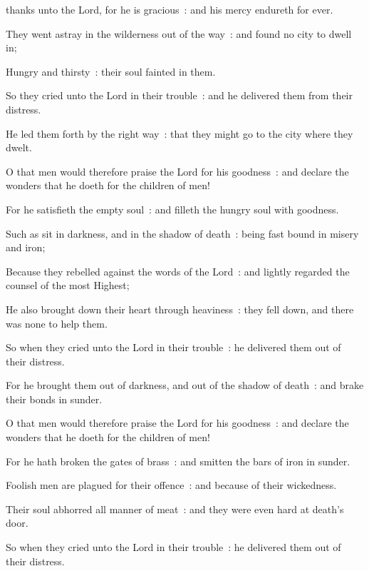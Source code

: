  thanks unto the Lord, for he is gracious~: and his mercy endureth for ever.\par
{}
They went astray in the wilderness out of the way~: and found no city to dwell in;\par
{}Hungry and thirsty~: their soul fainted in them.\par
{}So they cried unto the Lord in their trouble~: and he delivered them from their distress.\par
{}He led them forth by the right way~: that they might go to the city where they dwelt.\par
{}O that men would therefore praise the Lord for his goodness~: and declare the wonders that he doeth for the children of men!\par
{}For he satisfieth the empty soul~: and filleth the hungry soul with goodness.\par
{}Such as sit in darkness, and in the shadow of death~: being fast bound in misery and iron;\par
{}Because they rebelled against the words of the Lord~: and lightly regarded the counsel of the most Highest;\par
{}He also brought down their heart through heaviness~: they fell down, and there was none to help them.\par
{}So when they cried unto the Lord in their trouble~: he delivered them out of their distress.\par
{}For he brought them out of darkness, and out of the shadow of death~: and brake their bonds in sunder.\par
{}O that men would therefore praise the Lord for his goodness~: and declare the wonders that he doeth for the children of men!\par
{}For he hath broken the gates of brass~: and smitten the bars of iron in sunder.\par
{}Foolish men are plagued for their offence~: and because of their wickedness.\par
{}Their soul abhorred all manner of meat~: and they were even hard at death's door.\par
{}So when they cried unto the Lord in their trouble~: he delivered them out of their distress.\par
